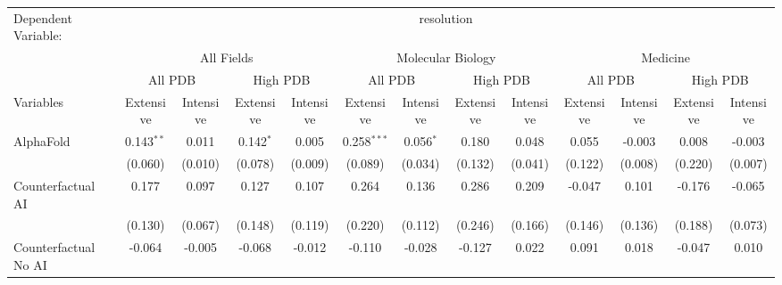 \begingroup
\centering
\begin{tabular}{lcccccccccccc}
   \tabularnewline \midrule \midrule
   Dependent Variable: & \multicolumn{12}{c}{resolution}\\
 & \multicolumn{4}{c}{All Fields} & \multicolumn{4}{c}{Molecular Biology} & \multicolumn{4}{c}{Medicine} \\
\cmidrule(lr){2-5} \cmidrule(lr){6-9} \cmidrule(lr){10-13}
 & \multicolumn{2}{c}{All PDB} & \multicolumn{2}{c}{High PDB} & \multicolumn{2}{c}{All PDB} & \multicolumn{2}{c}{High PDB} & \multicolumn{2}{c}{All PDB} & \multicolumn{2}{c}{High PDB} \\
\cmidrule(lr){2-3} \cmidrule(lr){4-5} \cmidrule(lr){6-7} \cmidrule(lr){8-9} \cmidrule(lr){10-11} \cmidrule(lr){12-13}
Variables & \multicolumn{1}{c}{Extensive} & \multicolumn{1}{c}{Intensive} & \multicolumn{1}{c}{Extensive} & \multicolumn{1}{c}{Intensive} & \multicolumn{1}{c}{Extensive} & \multicolumn{1}{c}{Intensive} & \multicolumn{1}{c}{Extensive} & \multicolumn{1}{c}{Intensive} & \multicolumn{1}{c}{Extensive} & \multicolumn{1}{c}{Intensive} & \multicolumn{1}{c}{Extensive} & \multicolumn{1}{c}{Intensive} \\
\cmidrule(lr){1-1}\cmidrule(lr){2-2} \cmidrule(lr){3-3} \cmidrule(lr){4-4} \cmidrule(lr){5-5} \cmidrule(lr){6-6} \cmidrule(lr){7-7} \cmidrule(lr){8-8} \cmidrule(lr){9-9} \cmidrule(lr){10-10} \cmidrule(lr){11-11} \cmidrule(lr){12-12} \cmidrule(lr){13-13}
   AlphaFold                                & 0.143$^{**}$ & 0.011       & 0.142$^{*}$ & 0.005       & 0.258$^{***}$ & 0.056$^{*}$ & 0.180   & 0.048   & 0.055   & -0.003  & 0.008   & -0.003\\   
                                            & (0.060)      & (0.010)     & (0.078)     & (0.009)     & (0.089)       & (0.034)     & (0.132) & (0.041) & (0.122) & (0.008) & (0.220) & (0.007)\\   
   Counterfactual AI                        & 0.177        & 0.097       & 0.127       & 0.107       & 0.264         & 0.136       & 0.286   & 0.209   & -0.047  & 0.101   & -0.176  & -0.065\\   
                                            & (0.130)      & (0.067)     & (0.148)     & (0.119)     & (0.220)       & (0.112)     & (0.246) & (0.166) & (0.146) & (0.136) & (0.188) & (0.073)\\   
   Counterfactual No AI                     & -0.064       & -0.005      & -0.068      & -0.012      & -0.110        & -0.028      & -0.127  & 0.022   & 0.091   & 0.018   & -0.047  & 0.010\\   

\end{tabular}
